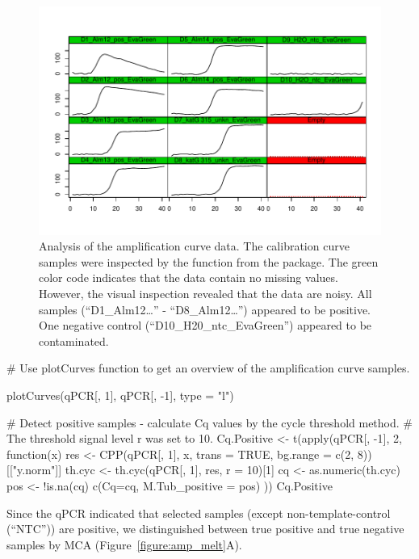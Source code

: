 \begin{figure}[htbp]
  \centering
  \includegraphics{figures/plotCurves.pdf}
  \caption{Analysis of the amplification curve data. The calibration curve 
samples were inspected by the  function from the 
 package. The green color code indicates that the data contain 
no missing values. However, the visual inspection revealed that the data are 
noisy. All samples (``D1\_Alm12\ldots'' - ``D8\_Alm12\ldots'') appeared to be 
positive. One negative control (``D10\_H20\_ntc\_EvaGreen'') appeared to be 
contaminated.}
  \label{figure:plotCurves}
\end{figure}

\begin{example}
# Use plotCurves function to get an overview of the amplification curve samples.

plotCurves(qPCR[, 1], qPCR[, -1], type = "l")

# Detect positive samples - calculate Cq values by the cycle threshold method. 
# The threshold signal level r was set to 10.
Cq.Positive <- t(apply(qPCR[, -1], 2, function(x)
{
  res <- CPP(qPCR[, 1], x, trans = TRUE, bg.range = c(2, 8))[["y.norm"]]
  th.cyc <- th.cyc(qPCR[, 1], res, r = 10)[1]
  cq <- as.numeric(th.cyc)
  pos <- !is.na(cq)
  c(Cq=cq, M.Tub_positive = pos)
}
))
Cq.Positive
\end{example}

Since the qPCR indicated that selected samples (except non-template-control 
(``NTC'')) are positive, we distinguished between true positive and true negative 
samples by MCA (Figure~\ref{figure:amp_melt}A).

